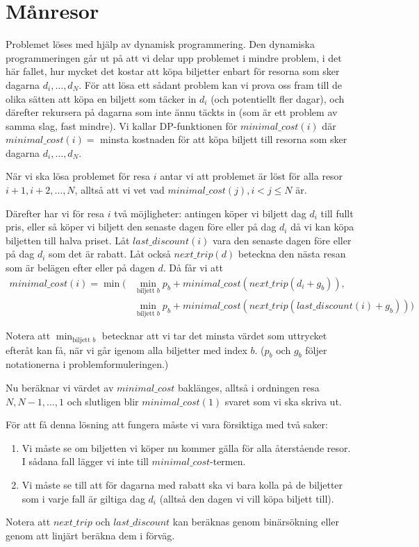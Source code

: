 \section{Månresor}
Problemet löses med hjälp av dynamisk programmering.
Den dynamiska programmeringen går ut på att vi delar upp problemet i mindre problem, i det här fallet, hur mycket det kostar att köpa biljetter enbart för resorna som sker dagarna $d_i, \dots, d_N$.
För att lösa ett sådant problem kan vi prova oss fram till de olika sätten att köpa en biljett som täcker in $d_i$ (och potentiellt fler dagar), och därefter rekursera på
dagarna som inte ännu täckts in (som är ett problem av samma slag, fast mindre).
Vi kallar DP-funktionen för $minimal\_cost(i)$ där $minimal\_cost(i)=$ minsta kostnaden för att köpa biljett till resorna som sker dagarna $d_i,\dots,d_N$. 

När vi ska lösa problemet för resa $i$ antar vi att problemet är löst för alla resor $i+1,i+2,\dots,N$, alltså att vi vet vad $minimal\_cost(j), i<j\leq N$ är.

Därefter har vi för resa $i$ två möjligheter: antingen köper vi biljett dag $d_i$ till fullt pris, eller så köper vi biljett den senaste dagen före eller på dag $d_i$ då vi kan köpa biljetten till halva priset.
Låt $last\_discount(i)$ vara den senaste dagen före eller på dag $d_i$ som det är rabatt.
Låt också $next\_trip(d)$ beteckna den nästa resan som är belägen efter eller på dagen $d$.
Då får vi att 
\begin{align*}
minimal\_cost(i) = \min(&\min_{\text{biljett }b} p_b+minimal\_cost(next\_trip(d_i+g_b)), \\
  &\min_{\text{biljett }b}p_b+minimal\_cost(next\_trip(last\_discount(i)+g_b)))
\end{align*}

Notera att $\min_{\text{biljett }b}$ betecknar att vi tar det minsta värdet som uttrycket efteråt kan få, när vi går igenom alla biljetter med index $b$. ($p_b$ och $g_b$ följer notationerna i problemformuleringen.)

Nu beräknar vi värdet av $minimal\_cost$ baklänges, alltså i ordningen resa $N,N-1,\dots,1$ och slutligen blir $minimal\_cost(1)$ svaret som vi ska skriva ut.

För att få denna lösning att fungera måste vi vara försiktiga med två saker:
\begin{enumerate}
  \item Vi måste se om biljetten vi köper nu kommer gälla för alla återstående resor. I sådana fall lägger vi inte till $minimal\_cost$-termen.
  \item Vi måste se till att för dagarna med rabatt ska vi bara kolla på de biljetter som i varje fall är giltiga dag $d_i$ (alltså den dagen vi vill köpa biljett till). 
\end{enumerate}

Notera att $next\_trip$ och $last\_discount$ kan beräknas genom binärsökning eller genom att linjärt beräkna dem i förväg.
